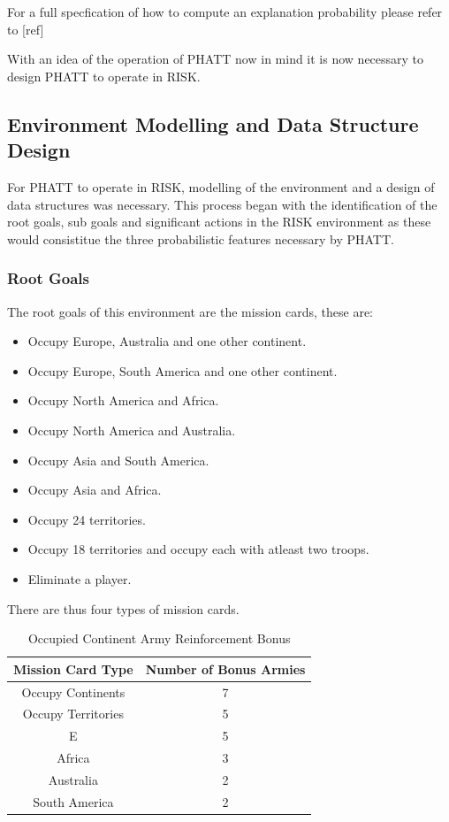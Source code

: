 \documentclass[parskip]{cs4rep}
\begin{document}
For a full specfication of how to compute an explanation probability please refer to [ref]

With an idea of the operation of PHATT now in mind it is now necessary to design PHATT to operate in RISK.

\subsection{Environment Modelling and Data Structure Design}

For PHATT to operate in RISK,  modelling of the environment and a design of data structures was necessary. This process began with the identification of the root goals, sub goals and significant actions in the RISK environment as these would consistitue the three probabilistic features necessary by PHATT.

\subsubsection{Root Goals}

The root goals of this environment are the mission cards, these are:

\begin{itemize}
\item
Occupy Europe, Australia and one other continent.
\item
Occupy Europe, South America and one other continent.
\item
Occupy North America and Africa.
\item
Occupy North America and Australia.
\item
Occupy Asia and South America.
\item
Occupy Asia and Africa.
\item
Occupy 24 territories.
\item
Occupy 18 territories and occupy each with atleast two troops.
\item
Eliminate a player.
\newline
\end{itemize}

There are thus four types of mission cards.

\begin{table}[ht]
\centering
\begin{tabular}{|c|c|}
\hline 
\textbf{Mission Card Type} & \textbf{Number of Bonus Armies} \\ 
\hline 
Occupy Continents & 7 \\ 
\hline 
Occupy Territories & 5 \\ 
\hline 
E & 5 \\ 
\hline 
Africa & 3 \\
\hline
Australia & 2 \\
\hline  
South America & 2 \\
\hline 
\end{tabular}
\caption{Occupied Continent Army Reinforcement Bonus}
\label{table:continent_bonus}
\end{table}
\end{document}
